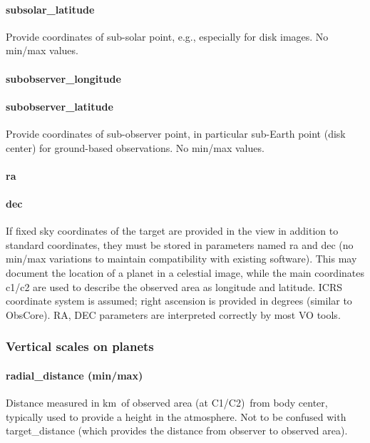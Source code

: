 \documentclass[11pt,a4paper]{ivoa}
\begin{document}
\paragraph{subsolar\_latitude}

Provide coordinates of sub-solar point, e.g., especially for disk images. No min/max values.

\paragraph{subobserver\_longitude}

\paragraph{subobserver\_latitude}

Provide coordinates of sub-observer point, in particular sub-Earth point (disk center) for ground-based observations. No min/max values.

\paragraph{ra}

\paragraph{dec}

If fixed sky coordinates of the target are provided in the view in addition to standard coordinates, they must be stored in parameters named ra and dec (no min/max variations to maintain compatibility with existing software). This may document the location of a planet in a celestial image, while the main coordinates c1/c2 are used to describe the observed area as longitude and latitude. ICRS coordinate system is assumed; right ascension is provided in degrees (similar to ObsCore). RA, DEC parameters are interpreted correctly by most VO tools.

\subsubsection{Vertical scales on planets}

\paragraph{radial\_distance (min/max)}

Distance measured in km of observed area (at C1/C2) from body center, typically used to provide a height in the atmosphere. Not to be confused with target\_distance (which provides the distance from observer to observed area). 
\end{document}
